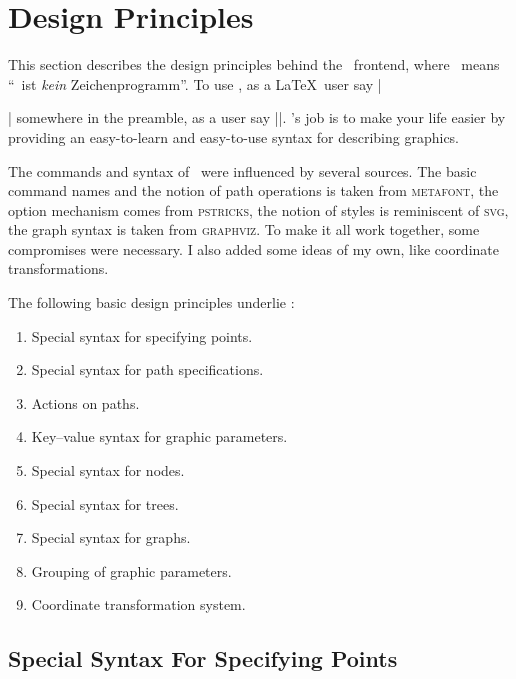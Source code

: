 %
%
%


\section{Design Principles}

This section describes the design principles behind the \tikzname\ frontend,
where \tikzname\ means ``\tikzname\ ist \emph{kein} Zeichenprogramm''. To use
\tikzname, as a \LaTeX\ user say |\usepackage{tikz}| somewhere in the preamble,
as a  user say ||. \tikzname's job is to make your
life easier by providing an easy-to-learn and easy-to-use syntax for describing
graphics.

The commands and syntax of \tikzname\ were influenced by several sources. The
basic command names and the notion of path operations is taken from
\textsc{metafont}, the option mechanism comes from \textsc{pstricks}, the
notion of styles is reminiscent of \textsc{svg}, the graph syntax is taken from
\textsc{graphviz}. To make it all work together, some compromises were
necessary. I also added some ideas of my own, like coordinate transformations.

The following basic design principles underlie \tikzname:
%
\begin{enumerate}
    \item Special syntax for specifying points.
    \item Special syntax for path specifications.
    \item Actions on paths.
    \item Key--value syntax for graphic parameters.
    \item Special syntax for nodes.
    \item Special syntax for trees.
    \item Special syntax for graphs.
    \item Grouping of graphic parameters.
    \item Coordinate transformation system.
\end{enumerate}


\subsection{Special Syntax For Specifying Points}

